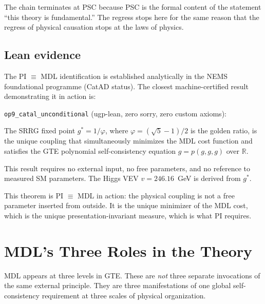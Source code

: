 \documentclass[11pt,a4paper]{article}
\newcommand{\lean}[1]{\texttt{#1}}
\begin{document}
\bigskip

The chain terminates at PSC because PSC is the formal content of the statement
``this theory is fundamental.''  The regress stops here for the same reason that
the regress of physical causation stops at the laws of physics.

\subsection{Lean evidence}

The PI $\equiv$ MDL identification is established analytically in the NEMS foundational
programme (CatAD status).  The closest machine-certified result
demonstrating it in action is:

\begin{tcolorbox}[colback=boxgreen,colframe=green!50!black,
  title={Lean result: MDL-minimizing physical coupling}]
\lean{op9\_catal\_unconditional} (ugp-lean, zero sorry, zero custom axioms):

The SRRG fixed point $g^* = 1/\varphi$, where $\varphi = (\sqrt{5}-1)/2$ is the
golden ratio, is the unique coupling that simultaneously minimizes the MDL cost
function and satisfies the GTE polynomial self-consistency equation
$g = p(g, g, g)$ over $\mathbb{R}$.

This result requires no external input, no free parameters, and no reference to
measured SM parameters.  The Higgs VEV $v = 246.16$~GeV is derived from $g^*$.
\end{tcolorbox}

This theorem is PI $\equiv$ MDL in action: the physical coupling is not a free
parameter inserted from outside.  It is the unique minimizer of the MDL cost,
which is the unique presentation-invariant measure, which is what PI requires.

\section{MDL's Three Roles in the Theory}
\label{sec:mdl_roles}

\begin{tcolorbox}[colback=boxblue,colframe=blue!40!black,
  title=Overview]
MDL appears at three levels in GTE.  These are \emph{not} three separate invocations
of the same external principle.  They are three manifestations of one global
self-consistency requirement at three scales of physical organization.
\end{tcolorbox}
\end{document}
